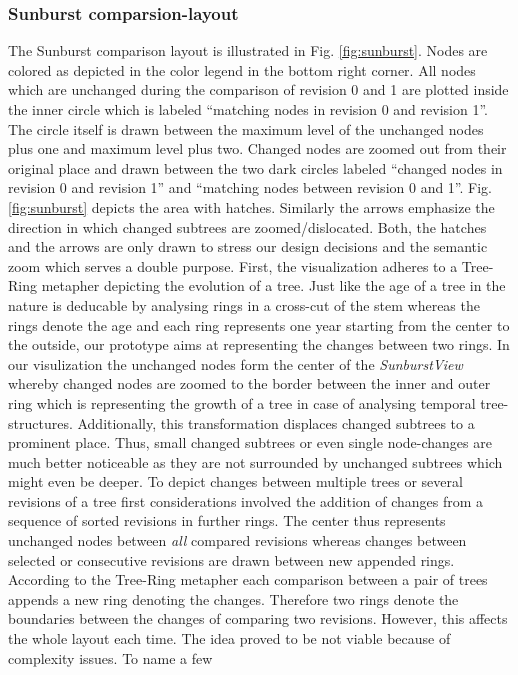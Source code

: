 \subsubsection{Sunburst comparsion-layout}
The Sunburst comparison layout is illustrated in Fig. \ref{fig:sunburst}. Nodes are colored as depicted in the color legend in the bottom right corner. All nodes which are unchanged during the comparison of revision 0 and 1 are plotted inside the inner circle which is labeled ``matching nodes in revision 0 and revision 1''. The circle itself is drawn between the maximum level of the unchanged nodes plus one and maximum level plus two. Changed nodes are zoomed out from their original place and drawn between the two dark circles labeled ``changed nodes in revision 0 and revision 1'' and ``matching nodes between revision 0 and 1''. Fig. \ref{fig:sunburst} depicts the area with hatches. Similarly the arrows emphasize the direction in which changed subtrees are zoomed/dislocated. Both, the hatches and the arrows are only drawn to stress our design decisions and the semantic zoom which serves a double purpose. First, the visualization adheres to a Tree-Ring metapher depicting the evolution of a tree. Just like the age of a tree in the nature is deducable by analysing rings in a cross-cut of the stem whereas the rings denote the age and each ring represents one year starting from the center to the outside, our prototype aims at representing the changes between two rings. In our visulization the unchanged nodes form the center of the \emph{SunburstView} whereby changed nodes are zoomed to the border between the inner and outer ring which is representing the growth of a tree in case of analysing temporal tree-structures. Additionally, this transformation displaces changed subtrees to a prominent place. Thus, small changed subtrees or even single node-changes are much better noticeable as they are not surrounded by unchanged subtrees which might even be deeper. To depict changes between multiple trees or several revisions of a tree first considerations involved the addition of changes from a sequence of sorted revisions in further rings. The center thus represents unchanged nodes between \emph{all} compared revisions whereas changes between selected or consecutive revisions are drawn between new appended rings. According to the Tree-Ring metapher each comparison between a pair of trees appends a new ring denoting the changes. Therefore two rings denote the boundaries between the changes of comparing two revisions. However, this affects the whole layout each time. The idea proved to be not viable because of complexity issues. To name a few

